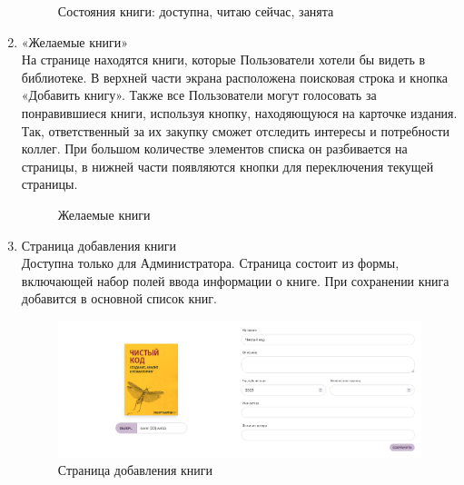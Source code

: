 \documentclass[project.tex]{subfiles}
\begin{document}
\begin{enumerate}
\begin{figure}[H]
       \caption{Состояния книги: доступна, читаю сейчас, занята} 
    \end{figure}
    \item «Желаемые книги»\\
    На странице находятся книги, которые Пользователи хотели бы видеть в библиотеке. В верхней части экрана расположена поисковая строка и кнопка «Добавить книгу». Также все Пользователи могут голосовать за понравившиеся книги, используя кнопку, находяющуюся на карточке издания. Так, ответственный за их закупку сможет отследить интересы и потребности коллег. 
    При большом количестве элементов списка он разбивается на страницы, в нижней части появляются кнопки для переключения текущей страницы.
    \begin{figure}[H]
       \label{pic:desired}
       \caption{Желаемые книги} 
    \end{figure}
    \item Страница добавления книги\\
    Доступна только для Администратора. Страница состоит из формы, включающей набор полей ввода информации о книге. При сохранении книга добавится в основной список книг.
    \begin{figure}[H]
       \includegraphics[width=\textwidth]{../../graphics/bookform.png}
       \caption{Страница добавления книги} 
       \label{pic:form}
    \end{figure}

\end{enumerate}
\end{document}
